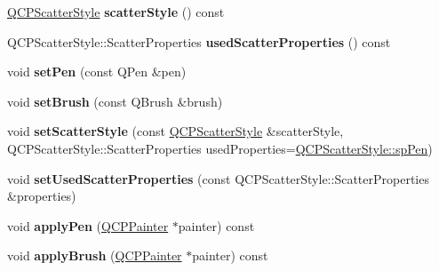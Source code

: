 \begin{DoxyCompactItemize}
\item 
\hyperlink{class_q_c_p_scatter_style}{Q\+C\+P\+Scatter\+Style} {\bfseries scatter\+Style} () const \hypertarget{class_q_c_p_selection_decorator_a347df79afebbfd5b5a2c9143214ee5b9}{}\label{class_q_c_p_selection_decorator_a347df79afebbfd5b5a2c9143214ee5b9}

\item 
Q\+C\+P\+Scatter\+Style\+::\+Scatter\+Properties {\bfseries used\+Scatter\+Properties} () const \hypertarget{class_q_c_p_selection_decorator_ab82ebdb4915fa7f5c1b253e23e780b13}{}\label{class_q_c_p_selection_decorator_ab82ebdb4915fa7f5c1b253e23e780b13}

\item 
void {\bfseries set\+Pen} (const Q\+Pen \&pen)\hypertarget{class_q_c_p_selection_decorator_ac2c8192e1e294aa3a4a7f32a859e3d76}{}\label{class_q_c_p_selection_decorator_ac2c8192e1e294aa3a4a7f32a859e3d76}

\item 
void {\bfseries set\+Brush} (const Q\+Brush \&brush)\hypertarget{class_q_c_p_selection_decorator_aa74b626be518ea17055f918d423c8c2d}{}\label{class_q_c_p_selection_decorator_aa74b626be518ea17055f918d423c8c2d}

\item 
void {\bfseries set\+Scatter\+Style} (const \hyperlink{class_q_c_p_scatter_style}{Q\+C\+P\+Scatter\+Style} \&scatter\+Style, Q\+C\+P\+Scatter\+Style\+::\+Scatter\+Properties used\+Properties=\hyperlink{class_q_c_p_scatter_style_a8974f6a20f8f6eea7781f0e6af9deb46a1b8f3179d60006d2bcfd4e14a3fcde79}{Q\+C\+P\+Scatter\+Style\+::sp\+Pen})\hypertarget{class_q_c_p_selection_decorator_ab403a613289714ff4fd4a0c0371ab116}{}\label{class_q_c_p_selection_decorator_ab403a613289714ff4fd4a0c0371ab116}

\item 
void {\bfseries set\+Used\+Scatter\+Properties} (const Q\+C\+P\+Scatter\+Style\+::\+Scatter\+Properties \&properties)\hypertarget{class_q_c_p_selection_decorator_a808c1607cd4e83869c04986e332455c0}{}\label{class_q_c_p_selection_decorator_a808c1607cd4e83869c04986e332455c0}

\item 
void {\bfseries apply\+Pen} (\hyperlink{class_q_c_p_painter}{Q\+C\+P\+Painter} $\ast$painter) const \hypertarget{class_q_c_p_selection_decorator_a9a0e62f544971034fec60e62748768b8}{}\label{class_q_c_p_selection_decorator_a9a0e62f544971034fec60e62748768b8}

\item 
void {\bfseries apply\+Brush} (\hyperlink{class_q_c_p_painter}{Q\+C\+P\+Painter} $\ast$painter) const \hypertarget{class_q_c_p_selection_decorator_aa7ecaa5c307cc65285cdf62364c69e56}{}\label{class_q_c_p_selection_decorator_aa7ecaa5c307cc65285cdf62364c69e56}


\end{DoxyCompactItemize}
